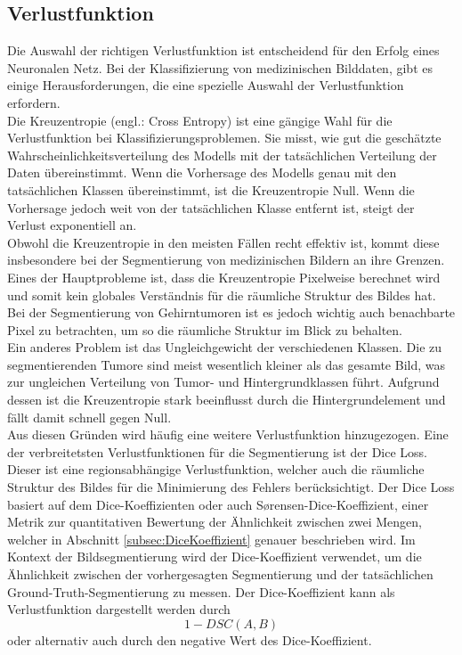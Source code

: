 \subsection{Verlustfunktion}
Die Auswahl der richtigen Verlustfunktion ist entscheidend für den Erfolg eines Neuronalen Netz. Bei der Klassifizierung von medizinischen Bilddaten, gibt es einige Herausforderungen, die eine spezielle Auswahl der Verlustfunktion erfordern.\\
Die Kreuzentropie (engl.: Cross Entropy) ist eine gängige Wahl für die Verlustfunktion bei Klassifizierungsproblemen. Sie misst, wie gut die geschätzte Wahrscheinlichkeitsverteilung des Modells mit der tatsächlichen Verteilung der Daten übereinstimmt. Wenn die Vorhersage des Modells genau mit den tatsächlichen Klassen übereinstimmt, ist die Kreuzentropie Null. Wenn die Vorhersage jedoch weit von der tatsächlichen Klasse entfernt ist, steigt der Verlust exponentiell an. \cite[vgl.][]{Murphy2012}\\
Obwohl die Kreuzentropie in den meisten Fällen recht effektiv ist, kommt diese insbesondere bei der Segmentierung von medizinischen Bildern an ihre Grenzen. Eines der Hauptprobleme ist, dass die Kreuzentropie Pixelweise berechnet wird und somit kein globales Verständnis für die räumliche Struktur des Bildes hat. Bei der Segmentierung von Gehirntumoren ist es jedoch wichtig auch benachbarte Pixel zu betrachten, um so die räumliche Struktur im Blick zu behalten. \\
Ein anderes Problem ist das Ungleichgewicht der verschiedenen Klassen. Die zu segmentierenden Tumore sind meist wesentlich kleiner als das gesamte Bild, was zur ungleichen Verteilung von Tumor- und Hintergrundklassen führt. Aufgrund dessen ist die Kreuzentropie stark beeinflusst durch die Hintergrundelement und fällt damit schnell gegen Null. \cite[][]{Yeung2021}\\
Aus diesen Gründen wird häufig eine weitere Verlustfunktion hinzugezogen. Eine der verbreitetsten Verlustfunktionen für die Segmentierung ist der Dice Loss. Dieser ist eine regionsabhängige Verlustfunktion, welcher auch die räumliche Struktur des Bildes für die Minimierung des Fehlers berücksichtigt. Der Dice Loss basiert auf dem Dice-Koeffizienten oder auch Sørensen-Dice-Koeffizient, einer Metrik zur quantitativen Bewertung der Ähnlichkeit zwischen zwei Mengen, welcher in Abschnitt \ref{subsec:DiceKoeffizient} genauer beschrieben wird. 
Im Kontext der Bildsegmentierung wird der Dice-Koeffizient verwendet, um die Ähnlichkeit zwischen der vorhergesagten Segmentierung und der tatsächlichen Ground-Truth-Segmentierung zu messen. Der Dice-Koeffizient kann als Verlustfunktion dargestellt werden durch 
\begin{equation}
  1 - DSC(A,B)
\end{equation}
oder alternativ auch durch den negative Wert des Dice-Koeffizient.  \cite[vgl.][]{Sudre2017}

